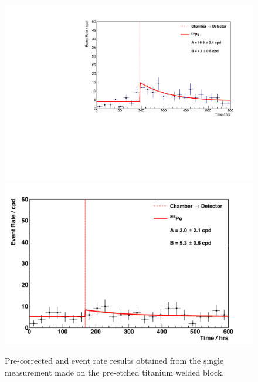 \begin{figure}[b!]
    \centering
    \includegraphics[scale=0.42]{Chapter_4/Figures/ucl_measurements/titanium_sheets_pre_etching_1_Po214.pdf}
    \includegraphics[scale=0.42]{Chapter_4/Figures/ucl_measurements/titanium_sheets_pre_etching_1_Po218.pdf}
    \caption[Pre-corrected \PoTOF{} and \PoTOE{} event rate results obtained from the single measurement made on the pre-etched titanium welded block.]
    {Pre-corrected \PoTOF{} and \PoTOE{} event rate results obtained from the single measurement made on the pre-etched titanium welded block.}
    \label{fig:ti_pre_etched_sheets_results}
\end{figure}
%

